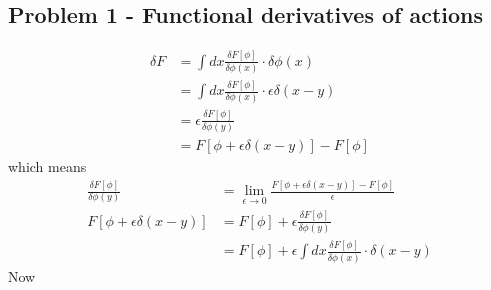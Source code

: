 \documentclass[10pt,a4paper]{book}
\theoremstyle{definition}
\begin{document}
\subsection{Problem 1 - Functional derivatives of actions}
\begin{align}
    \delta F
    &=\int dx \frac{\delta F[\phi]}{\delta\phi(x)}\cdot\delta\phi(x)\\
    &=\int dx \frac{\delta F[\phi]}{\delta\phi(x)}\cdot\epsilon\delta(x-y)\\
    &=\epsilon\frac{\delta F[\phi]}{\delta\phi(y)}\\
    &=F[\phi+\epsilon\delta(x-y)]-F[\phi]
\end{align}
which means
\begin{align}
    \frac{\delta F[\phi]}{\delta\phi(y)}&=\lim_{\epsilon\rightarrow0}\frac{F[\phi+\epsilon\delta(x-y)]-F[\phi]}{\epsilon}\\
    F[\phi+\epsilon\delta(x-y)]&=F[\phi]+\epsilon\frac{\delta F[\phi]}{\delta\phi(y)}\\
    &=F[\phi]+\epsilon\int dx \frac{\delta F[\phi]}{\delta\phi(x)}\cdot\delta(x-y)
\end{align}
Now
\end{document}
